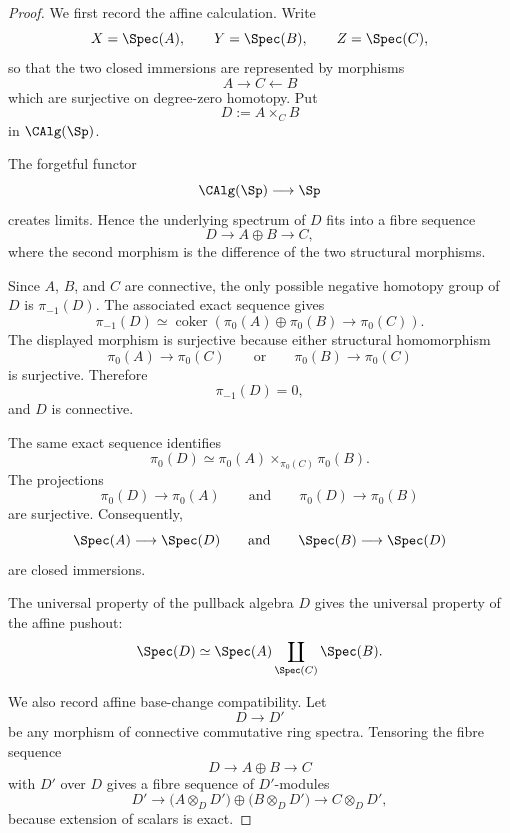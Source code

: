 \begin{proof}
We first record the affine calculation. Write
\[
    X=\Spec(A),
    \qquad
    Y=\Spec(B),
    \qquad
    Z=\Spec(C),
\]
so that the two closed immersions are represented by morphisms
\[
    A
    \longrightarrow
    C
    \longleftarrow
    B
\]
which are surjective on degree-zero homotopy. Put
\[
    D
    :=
    A\times_C B
\]
in $\CAlg(\Sp)$.

The forgetful functor
\[
    \CAlg(\Sp)
    \longrightarrow
    \Sp
\]
creates limits. Hence the underlying spectrum of $D$ fits into a fibre
sequence
\[
    D
    \longrightarrow
    A\oplus B
    \longrightarrow
    C,
\]
where the second morphism is the difference of the two structural
morphisms.

Since $A$, $B$, and $C$ are connective, the only possible negative
homotopy group of $D$ is $\pi_{-1}(D)$. The associated exact sequence
gives
\[
    \pi_{-1}(D)
    \simeq
    \operatorname{coker}
    \left(
        \pi_0(A)\oplus\pi_0(B)
        \longrightarrow
        \pi_0(C)
    \right).
\]
The displayed morphism is surjective because either structural
homomorphism
\[
    \pi_0(A)
    \longrightarrow
    \pi_0(C)
    \qquad\text{or}\qquad
    \pi_0(B)
    \longrightarrow
    \pi_0(C)
\]
is surjective. Therefore
\[
    \pi_{-1}(D)=0,
\]
and $D$ is connective.

The same exact sequence identifies
\[
    \pi_0(D)
    \simeq
    \pi_0(A)
    \times_{\pi_0(C)}
    \pi_0(B).
\]
The projections
\[
    \pi_0(D)
    \longrightarrow
    \pi_0(A)
    \qquad\text{and}\qquad
    \pi_0(D)
    \longrightarrow
    \pi_0(B)
\]
are surjective. Consequently,
\[
    \Spec(A)
    \longrightarrow
    \Spec(D)
    \qquad\text{and}\qquad
    \Spec(B)
    \longrightarrow
    \Spec(D)
\]
are closed immersions.

The universal property of the pullback algebra $D$ gives the universal
property of the affine pushout:
\[
    \Spec(D)
    \simeq
    \Spec(A)
    \coprod_{\Spec(C)}
    \Spec(B).
\]

We also record affine base-change compatibility. Let
\[
    D
    \longrightarrow
    D'
\]
be any morphism of connective commutative ring spectra. Tensoring the
fibre sequence
\[
    D
    \longrightarrow
    A\oplus B
    \longrightarrow
    C
\]
with $D'$ over $D$ gives a fibre sequence of $D'$-modules
\[
    D'
    \longrightarrow
    \bigl(
        A\otimes_DD'
    \bigr)
    \oplus
    \bigl(
        B\otimes_DD'
    \bigr)
    \longrightarrow
    C\otimes_DD',
\]
because extension of scalars is exact.


\end{proof}
